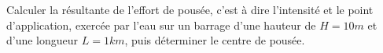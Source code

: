 \documentclass[lecture.tex]{subfiles}
\begin{document}
\exercice{}

Calculer la résultante de l'effort de pousée, c'est à dire l'intensité et le point d'application, exercée par l'eau sur un barrage d'une hauteur de $H = 10m$ et d'une longueur $L=1km$, puis déterminer le centre de pousée.

\finexercice
\end{document}
